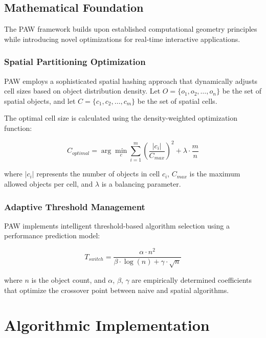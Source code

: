 \documentclass[10pt]{article}
\begin{document}
\subsection{Mathematical Foundation}

The PAW framework builds upon established computational geometry principles while introducing novel optimizations for real-time interactive applications.

\subsubsection{Spatial Partitioning Optimization}

PAW employs a sophisticated spatial hashing approach that dynamically adjusts cell sizes based on object distribution density. Let $O = \{o_1, o_2, \ldots, o_n\}$ be the set of spatial objects, and let $C = \{c_1, c_2, \ldots, c_m\}$ be the set of spatial cells.

The optimal cell size is calculated using the density-weighted optimization function:

\begin{equation}
    C_{optimal} = \arg\min_{c} \sum_{i=1}^{m} \left( \frac{|c_i|}{C_{max}} \right)^2 + \lambda \cdot \frac{m}{n}
\end{equation}

where $|c_i|$ represents the number of objects in cell $c_i$, $C_{max}$ is the maximum allowed objects per cell, and $\lambda$ is a balancing parameter.

\subsubsection{Adaptive Threshold Management}

PAW implements intelligent threshold-based algorithm selection using a performance prediction model:

\begin{equation}
    T_{switch} = \frac{\alpha \cdot n^2}{\beta \cdot \log(n) + \gamma \cdot \sqrt{n}}
\end{equation}

where $n$ is the object count, and $\alpha$, $\beta$, $\gamma$ are empirically determined coefficients that optimize the crossover point between naive and spatial algorithms.

\section{Algorithmic Implementation}
\end{document}
